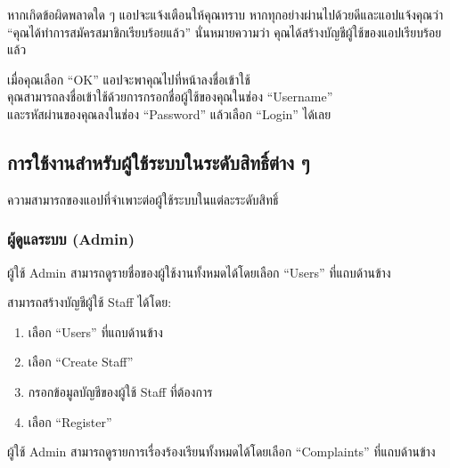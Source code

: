 หากเกิดข้อผิดพลาดใด ๆ แอปจะแจ้งเตือนให้คุณทราบ
หากทุกอย่างผ่านไปด้วยดีและแอปแจ้งคุณว่า ``คุณได้ทำการสมัครสมาชิกเรียบร้อยแล้ว'' นั่นหมายความว่า คุณได้สร้างบัญชีผู้ใช้ของแอปเรียบร้อยแล้ว

เมื่อคุณเลือก ``OK'' แอปจะพาคุณไปที่หน้าลงชื่อเข้าใช้\\
คุณสามารถลงชื่อเข้าใช้ด้วยการกรอกชื่อผู้ใช้ของคุณในช่อง ``Username''\\
และรหัสผ่านของคุณลงในช่อง ``Password'' แล้วเลือก ``Login'' ได้เลย

\pagebreak[4]

\subsection{การใช้งานสำหรับผู้ใช้ระบบในระดับสิทธิ์ต่าง ๆ}\label{subsec:role-specific-usage}

ความสามารถของแอปที่จำเพาะต่อผู้ใช้ระบบในแต่ละระดับสิทธิ์

\subsubsection{ผู้ดูแลระบบ (Admin)}\label{subsubsec:role-usage-admin}


ผู้ใช้ Admin สามารถดูรายชื่อของผู้ใช้งานทั้งหมดได้โดยเลือก ``Users'' ที่แถบด้านข้าง


\pagebreak[4]



สามารถสร้างบัญชีผู้ใช้ Staff ได้โดย:

\begin{enumerate}
    \item เลือก ``Users'' ที่แถบด้านข้าง
    \item เลือก ``Create Staff''
    \item กรอกข้อมูลบัญชีของผู้ใช้ Staff ที่ต้องการ
    \item เลือก ``Register''
\end{enumerate}



ผู้ใช้ Admin สามารถดูรายการเรื่องร้องเรียนทั้งหมดได้โดยเลือก ``Complaints'' ที่แถบด้านข้าง

